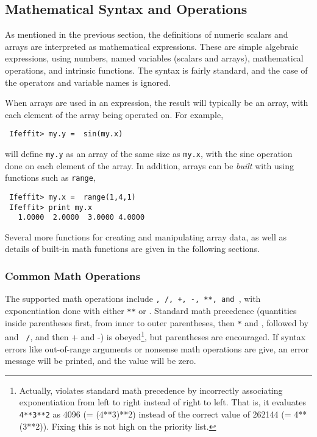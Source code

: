 \subsection{Mathematical Syntax and Operations} \label{Ch:Structure-math}

As mentioned in the previous section, the definitions of numeric scalars
and arrays are interpreted as mathematical expressions.  These are simple
algebraic expressions, using numbers, named variables (scalars and arrays),
mathematical operations, and intrinsic functions.  The syntax is fairly
standard, and the case of the operators and variable names is ignored.

When arrays are used in an expression, the result will typically be an array,
with each element of the array being operated on.  For example,
\begin{verbatim}
 Ifeffit> my.y =  sin(my.x) 
\end{verbatim}
\noindent
will define {\tt{my.y}} as an array of the same size as {\tt{my.x}}, with
the sine operation done on each element of the array.  In addition, arrays
can be {\emph{built}} with {\ifeffit} using functions such as {\tt{range}},
\begin{verbatim}
 Ifeffit> my.x =  range(1,4,1)
 Ifeffit> print my.x
   1.0000  2.0000  3.0000 4.0000 
\end{verbatim}
\noindent
Several more functions for creating and manipulating array data, as well as
details of built-in math functions are given in the following sections.


\subsubsection{Common Math Operations}

The supported math operations include {\tt *, /, +, -, **, and {\caret}},
with exponentiation done with either {\tt{**}} or {\tt{\caret}}.  Standard
math precedence (quantities inside parentheses first, from inner to outer
parentheses, then {\tt **} and {\tt \caret}, followed by {\tt *} and {\tt
  /}, and then + and -) is obeyed{\footnote{Actually, {\ifeffit} violates
    standard math precedence by incorrectly associating exponentiation from
    left to right instead of right to left. That is, it evaluates
    {\tt{4**3**2}} as 4096 (= (4**3)**2) instead of the correct value of
    262144 (= 4**(3**2)).  Fixing this is not high on the priority list.}},
but parentheses are encouraged.  If syntax errors like out-of-range
arguments or nonsense math operations are give, an error message will be
printed, and the value will be zero.

